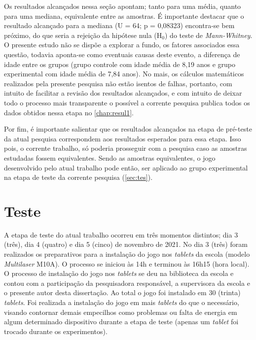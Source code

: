 Os resultados alcançados nessa seção apontam; tanto para uma média, quanto para uma mediana, equivalente entre as amostras. É importante destacar que o resultado alcançado para a mediana (U = 64; p = 0,08323) encontra-se bem próximo, do que seria a rejeição da hipótese nula (H$_0$) do teste de \textit{Mann-Whitney}. O presente estudo não se dispõe a explorar a fundo, os fatores associados essa questão, todavia aponta-se como eventuais causas deste evento, a diferença de idade entre os grupos (grupo controle com idade média de 8,19 anos e grupo experimental com idade média de 7,84 anos). %
No mais, os cálculos matemáticos realizados pela presente pesquisa não estão isentos de falhas, portanto, com intuito de facilitar a revisão dos resultados alcançados, e com intuito de deixar todo o processo mais transparente o possível a corrente pesquisa publica todos os dados obtidos nessa etapa no \autoref{chap:resul1}.

Por fim, é importante salientar que os resultados alcançados na etapa de pré-teste da atual pesquisa correspondem aos resultados esperados para essa etapa. Isso pois, o corrente trabalho, só poderia prosseguir com a pesquisa caso as amostras estudadas fossem equivalentes. Sendo as amostras equivalentes, o jogo desenvolvido pelo atual trabalho pode então, ser aplicado ao grupo experimental na etapa de teste da corrente pesquisa (\autoref{sec:tes}).


\section{Teste}\label{sec:tes}

A etapa de teste do atual trabalho ocorreu em três momentos distintos; dia 3 (três), dia 4 (quatro) e dia 5 (cinco) de novembro de 2021. No dia 3 (três) foram realizados os preparativos para a instalação do jogo nos \textit{tablets} da escola (modelo \textit{Multilaser} M10A). O processo se iniciou às 14h e terminou às 16h15 (hora local). O processo de instalação do jogo nos \textit{tablets} se deu na biblioteca da escola e contou com a participação da %
pesquisadora responsável, a supervisora %
da escola e o presente autor desta dissertação. Ao total o jogo foi instalado em 30 (trinta) \textit{tablets}. Foi realizada a instalação do jogo em mais \textit{tablets} do que o necessário, visando contornar demais empecilhos como problemas ou falta de energia em algum determinado dispositivo durante a etapa de teste (apenas um \textit{tablet} foi trocado durante os experimentos). %

